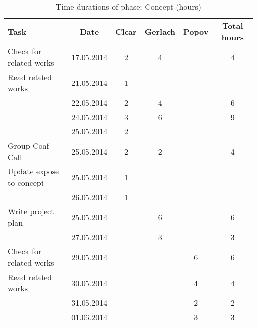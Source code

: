 \begin{table}[H]
\renewcommand{\arraystretch}{1.6}
\begin{threeparttable}

  \caption{Time durations of phase: Concept (hours)}
  
  \begin{tabular}{p{3cm} c|c c c| c}
      \textbf{Task} & \textbf{Date}& \textbf{Clear} & \textbf{Gerlach} & \textbf{Popov} & \textbf{Total hours} \\
        Check for related works
        				& 17.05.2014 &	2	&  4		&		& 4 \\
        Read related works
                        & 21.05.2014 &	1	&  		&		&  \\
        				& 22.05.2014 &	2	&  4		&		& 6 \\
                        & 24.05.2014 &	3	&  6		&		& 9 \\
                        & 25.05.2014 &	2	&  		&		&  \\
        Group Conf-Call
        				& 25.05.2014 &	2	&  2		&		& 4 \\
        Update expose to concept
        				& 25.05.2014 &  1	&  		&   	&  \\
                        & 26.05.2014 &  1	&  		&   	&  \\
        Write project plan
        				& 25.05.2014 &  	&  6		&   	& 6 \\
                        & 27.05.2014 &		&  3		&		& 3 \\
		Check for related works
        				& 29.05.2014 &		&  		&	6	& 6 \\                        
		Read related works                        
        				& 30.05.2014 &		&  		&	4	& 4 \\                        
						& 31.05.2014 &		&  		&	2	& 2 \\
                        & 01.06.2014 &		&  		&	3	& 3 \\

  \end{tabular}

\end{threeparttable}

\end{table}


